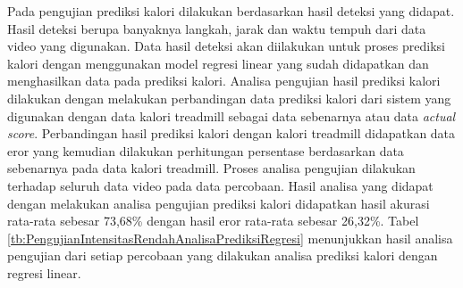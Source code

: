 Pada pengujian prediksi kalori dilakukan berdasarkan hasil deteksi yang didapat. Hasil deteksi berupa banyaknya langkah, jarak dan waktu tempuh dari data video yang digunakan. Data hasil deteksi akan diilakukan untuk proses prediksi kalori dengan menggunakan model regresi linear yang sudah didapatkan dan menghasilkan data pada prediksi kalori. Analisa pengujian hasil prediksi kalori dilakukan dengan melakukan perbandingan data prediksi kalori dari sistem yang digunakan dengan data kalori treadmill sebagai data sebenarnya atau data \emph{actual score}. Perbandingan hasil prediksi kalori dengan kalori treadmill didapatkan data eror yang kemudian dilakukan perhitungan persentase berdasarkan data sebenarnya pada data kalori treadmill. Proses analisa pengujian dilakukan terhadap seluruh data video pada data percobaan. Hasil analisa yang didapat dengan melakukan analisa pengujian prediksi kalori didapatkan hasil akurasi rata-rata sebesar 73,68\% dengan hasil eror rata-rata sebesar 26,32\%. Tabel \ref{tb:PengujianIntensitasRendahAnalisaPrediksiRegresi} menunjukkan hasil analisa pengujian dari setiap percobaan yang dilakukan analisa prediksi kalori dengan regresi linear.

